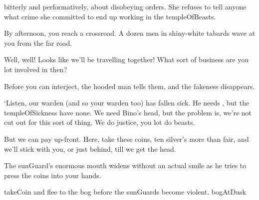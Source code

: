 bitterly and performatively, about disobeying orders.
She refuses to tell anyone what crime she committed to end up working in the \gls{templeOfBeasts}.

By afternoon, you reach a crossroad.
A dozen men in shiny-white tabards wave at you from the far road.

\begin{speechtext}
  Well, well!
  Looks like we'll be travelling together!
  What sort of business are you lot involved in then?
\end{speechtext}

Before you can interject, the hooded man tells them, and the fakeness disappears.

\begin{speechtext}
  `Listen, our \gls{warden} (and so your \gls{warden} too) has fallen sick.
  He needs , but the \gls{templeOfSickness} have none.
  We need Bino's head, but the problem is, we're not cut out for this sort of thing.
  We do justice, you lot do beasts.

  But we can pay up-front.
  Here, take these coins, ten silver's more than fair, and we'll stick with you, or just behind, till we get the head.
\end{speechtext}

The \gls{sunGuard}'s enormous mouth widens without an actual smile as he tries to press the coins into your hands.

\begin{selectPath}
  {}%
  {takeCoin}
  {and flee to the bog before the \glspl{sunGuard} become violent.}%
  {bogAtDusk}
\end{selectPath}

